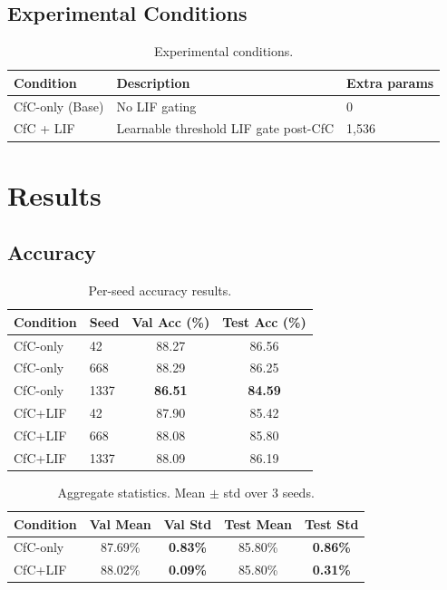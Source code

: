 \documentclass[11pt]{article}
\begin{document}
\subsection{Experimental Conditions}

\begin{table}[h]
\centering
\caption{Experimental conditions.}
\label{tab:conditions}
\begin{tabular}{lll}
\toprule
\textbf{Condition} & \textbf{Description} & \textbf{Extra params} \\
\midrule
CfC-only (Base) & No LIF gating & 0 \\
CfC + LIF & Learnable threshold LIF gate post-CfC & 1{,}536 \\
\bottomrule
\end{tabular}
\end{table}


\section{Results}

\subsection{Accuracy}

\begin{table}[h]
\centering
\caption{Per-seed accuracy results.}
\label{tab:per-seed}
\begin{tabular}{llcc}
\toprule
\textbf{Condition} & \textbf{Seed} & \textbf{Val Acc (\%)} & \textbf{Test Acc (\%)} \\
\midrule
CfC-only & 42 & 88.27 & 86.56 \\
CfC-only & 668 & 88.29 & 86.25 \\
CfC-only & 1337 & \textbf{86.51} & \textbf{84.59} \\
\midrule
CfC+LIF & 42 & 87.90 & 85.42 \\
CfC+LIF & 668 & 88.08 & 85.80 \\
CfC+LIF & 1337 & 88.09 & 86.19 \\
\bottomrule
\end{tabular}
\end{table}

\begin{table}[h]
\centering
\caption{Aggregate statistics. Mean $\pm$ std over 3 seeds.}
\label{tab:aggregate}
\begin{tabular}{lcccc}
\toprule
\textbf{Condition} & \textbf{Val Mean} & \textbf{Val Std} & \textbf{Test Mean} & \textbf{Test Std} \\
\midrule
CfC-only & 87.69\% & \textbf{0.83\%} & 85.80\% & \textbf{0.86\%} \\
CfC+LIF & 88.02\% & \textbf{0.09\%} & 85.80\% & \textbf{0.31\%} \\
\bottomrule
\end{tabular}
\end{table}
\end{document}
